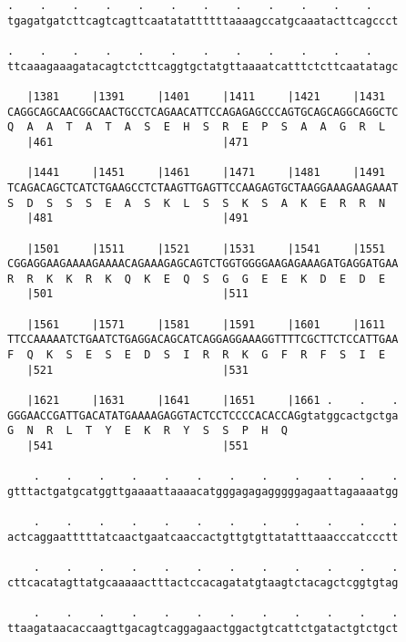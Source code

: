 \documentclass{article}
\begin{document}
\begin{Verbatim}
.    .    .    .    .    .    .    .    .    .    .    .    
tgagatgatcttcagtcagttcaatatattttttaaaagccatgcaaatacttcagccct
                                                            
.    .    .    .    .    .    .    .    .    .    .    .    
ttcaaagaaagatacagtctcttcaggtgctatgttaaaatcatttctcttcaatatagc
                                                            
   |1381     |1391     |1401     |1411     |1421     |1431  
CAGGCAGCAACGGCAACTGCCTCAGAACATTCCAGAGAGCCCAGTGCAGCAGGCAGGCTC
Q  A  A  T  A  T  A  S  E  H  S  R  E  P  S  A  A  G  R  L  
   |461                          |471                       
  
   |1441     |1451     |1461     |1471     |1481     |1491  
TCAGACAGCTCATCTGAAGCCTCTAAGTTGAGTTCCAAGAGTGCTAAGGAAAGAAGAAAT
S  D  S  S  S  E  A  S  K  L  S  S  K  S  A  K  E  R  R  N  
   |481                          |491                       
  
   |1501     |1511     |1521     |1531     |1541     |1551  
CGGAGGAAGAAAAGAAAACAGAAAGAGCAGTCTGGTGGGGAAGAGAAAGATGAGGATGAA
R  R  K  K  R  K  Q  K  E  Q  S  G  G  E  E  K  D  E  D  E  
   |501                          |511                       
  
   |1561     |1571     |1581     |1591     |1601     |1611  
TTCCAAAAATCTGAATCTGAGGACAGCATCAGGAGGAAAGGTTTTCGCTTCTCCATTGAA
F  Q  K  S  E  S  E  D  S  I  R  R  K  G  F  R  F  S  I  E  
   |521                          |531                       
  
   |1621     |1631     |1641     |1651     |1661 .    .    .
GGGAACCGATTGACATATGAAAAGAGGTACTCCTCCCCACACCAGgtatggcactgctga
G  N  R  L  T  Y  E  K  R  Y  S  S  P  H  Q                 
   |541                          |551                       
  
    .    .    .    .    .    .    .    .    .    .    .    .
gtttactgatgcatggttgaaaattaaaacatgggagagagggggagaattagaaaatgg
                                                            
    .    .    .    .    .    .    .    .    .    .    .    .
actcaggaatttttatcaactgaatcaaccactgttgtgttatatttaaacccatccctt
                                                            
    .    .    .    .    .    .    .    .    .    .    .    .
cttcacatagttatgcaaaaactttactccacagatatgtaagtctacagctcggtgtag
                                                            
    .    .    .    .    .    .    .    .    .    .    .    .
ttaagataacaccaagttgacagtcaggagaactggactgtcattctgatactgtctgct
                                                            

\end{Verbatim}
\end{document}
